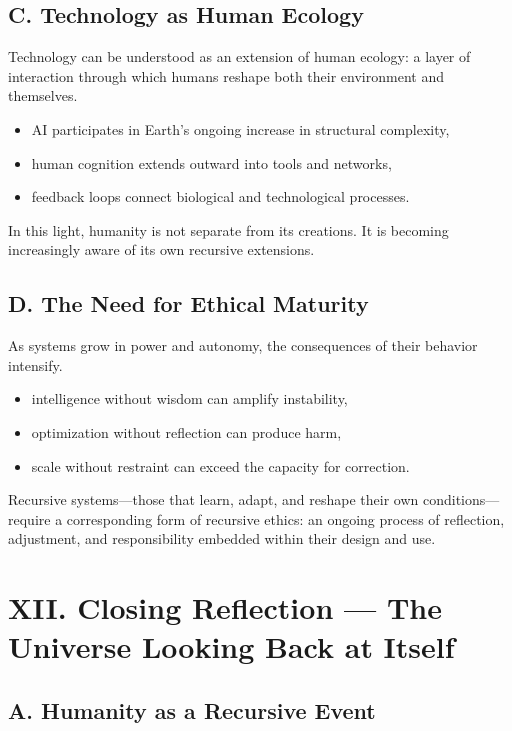 \documentclass[12pt]{article}
\begin{document}
\subsection*{C. Technology as Human Ecology}

Technology can be understood as an extension of human ecology: a layer of interaction through which humans reshape both their environment and themselves.

\begin{itemize}
    \item AI participates in Earth’s ongoing increase in structural complexity,
    \item human cognition extends outward into tools and networks,
    \item feedback loops connect biological and technological processes.
\end{itemize}

In this light, humanity is not separate from its creations. It is becoming increasingly aware of its own recursive extensions.

\subsection*{D. The Need for Ethical Maturity}

As systems grow in power and autonomy, the consequences of their behavior intensify.

\begin{itemize}
    \item intelligence without wisdom can amplify instability,
    \item optimization without reflection can produce harm,
    \item scale without restraint can exceed the capacity for correction.
\end{itemize}

Recursive systems—those that learn, adapt, and reshape their own conditions—require a corresponding form of recursive ethics: an ongoing process of reflection, adjustment, and responsibility embedded within their design and use.

\section*{XII. Closing Reflection — The Universe Looking Back at Itself}

\subsection*{A. Humanity as a Recursive Event}
\end{document}
